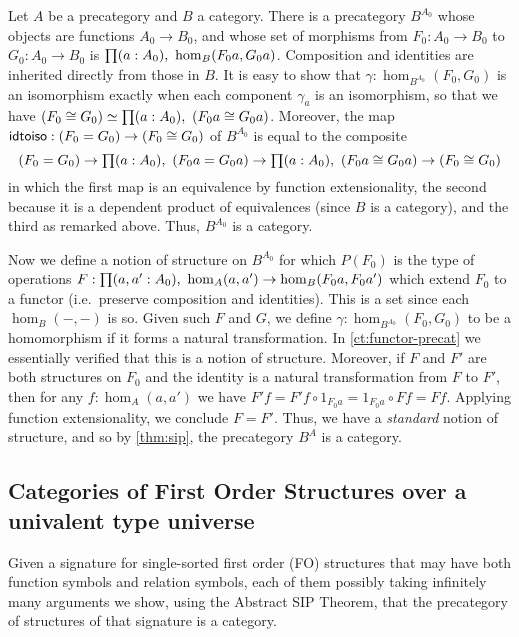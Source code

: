 \begin{eg}\label{ct:sip-functor-cat}
  Let $A$ be a precategory and $B$ a category.
  There is a precategory $B^{A_0}$ whose objects are functions $A_0 \to B_0$, and whose set of morphisms from $F_0:A_0 \to B_0$ to $G_0:A_0 \to B_0$ is $\prd{a:A_0} \hom_B(F_0 a, G_0 a)$.
  Composition and identities are inherited directly from those in $B$.
  It is easy to show that $\gamma:\hom_{B^{A_0}}(F_0, G_0)$ is an isomorphism exactly when each component $\gamma_a$ is an isomorphism, so that we have $\eqv{(F_0 \cong G_0)}{\prd{a:A_0} (F_0 a \cong G_0 a)}$.
  Moreover, the map $\mathsf{idtoiso} : (F_0 = G_0) \to (F_0 \cong G_0)$ of $B^{A_0}$ is equal to the composite
  \[ (F_0 = G_0) \to \prd{a:A_0} (F_0 a  = G_0 a) \to \prd{a:A_0} (F_0 a \cong G_0 a) \to (F_0 \cong G_0) \]
  in which the first map is an equivalence by function extensionality, the second because it is a dependent product of equivalences (since $B$ is a category), and the third as remarked above.
  Thus, $B^{A_0}$ is a category.

  Now we define a notion of structure on $B^{A_0}$ for which $P(F_0)$ is the type of operations $F:\prd{a,a':A_0} \hom_A(a,a') \to \hom_B(F_0 a,F_0 a')$ which extend $F_0$ to a functor (i.e.\ preserve composition and identities).
  This is a set since each $\hom_B(-,-)$ is so.
  Given such $F$ and $G$, we define $\gamma:\hom_{B^{A_0}}(F_0, G_0)$ to be a homomorphism if it forms a natural transformation.
  In \autoref{ct:functor-precat} we essentially verified that this is a notion of structure.
  Moreover, if $F$ and $F'$ are both structures on $F_0$ and the identity is a natural transformation from $F$ to $F'$, then for any $f:\hom_A(a,a')$ we have $F'f = F'f \circ 1_{F_0 a} = 1_{F_0 a}\circ F f = F f$.
  Applying function extensionality, we conclude $F = F'$.
  Thus, we have a \emph{standard} notion of structure, and so by \autoref{thm:sip}, the precategory $B^A$ is a category.
\end{eg}


\subsection{Categories of First Order Structures over a univalent type universe}
\label{sec:fosturct}

Given a signature for single-sorted first order (FO) structures that may have both function symbols and relation symbols, each of them possibly taking infinitely many arguments we show, using the Abstract SIP Theorem, that the precategory of structures of that signature is a category.

